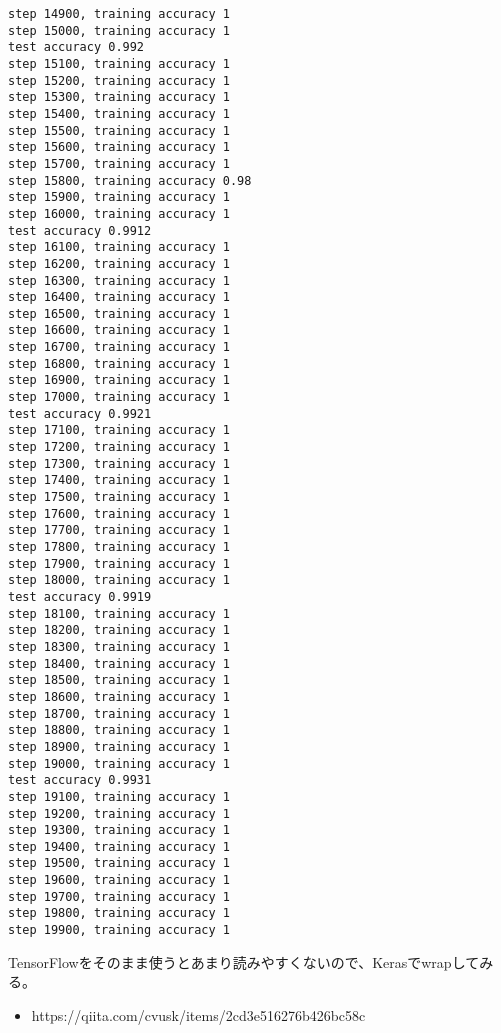 \documentclass[11pt]{article}
\providecommand{\tightlist}{%
      \setlength{\itemsep}{0pt}\setlength{\parskip}{0pt}}
\begin{document}
\begin{Verbatim}[commandchars=\\\{\}]
step 14900, training accuracy 1
step 15000, training accuracy 1
test accuracy 0.992
step 15100, training accuracy 1
step 15200, training accuracy 1
step 15300, training accuracy 1
step 15400, training accuracy 1
step 15500, training accuracy 1
step 15600, training accuracy 1
step 15700, training accuracy 1
step 15800, training accuracy 0.98
step 15900, training accuracy 1
step 16000, training accuracy 1
test accuracy 0.9912
step 16100, training accuracy 1
step 16200, training accuracy 1
step 16300, training accuracy 1
step 16400, training accuracy 1
step 16500, training accuracy 1
step 16600, training accuracy 1
step 16700, training accuracy 1
step 16800, training accuracy 1
step 16900, training accuracy 1
step 17000, training accuracy 1
test accuracy 0.9921
step 17100, training accuracy 1
step 17200, training accuracy 1
step 17300, training accuracy 1
step 17400, training accuracy 1
step 17500, training accuracy 1
step 17600, training accuracy 1
step 17700, training accuracy 1
step 17800, training accuracy 1
step 17900, training accuracy 1
step 18000, training accuracy 1
test accuracy 0.9919
step 18100, training accuracy 1
step 18200, training accuracy 1
step 18300, training accuracy 1
step 18400, training accuracy 1
step 18500, training accuracy 1
step 18600, training accuracy 1
step 18700, training accuracy 1
step 18800, training accuracy 1
step 18900, training accuracy 1
step 19000, training accuracy 1
test accuracy 0.9931
step 19100, training accuracy 1
step 19200, training accuracy 1
step 19300, training accuracy 1
step 19400, training accuracy 1
step 19500, training accuracy 1
step 19600, training accuracy 1
step 19700, training accuracy 1
step 19800, training accuracy 1
step 19900, training accuracy 1

    \end{Verbatim}

    TensorFlowをそのまま使うとあまり読みやすくないので、Kerasでwrapしてみる。

\begin{itemize}
\tightlist
\item
  https://qiita.com/cvusk/items/2cd3e516276b426bc58c
\end{itemize}
\end{document}
